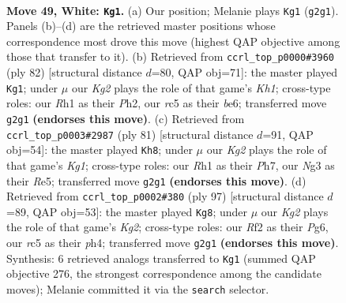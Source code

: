 \documentclass[11pt]{article}
\begin{document}
\clearpage

\begin{figure}[p]\centering
\begin{subfigure}{0.46\textwidth}\centering
\resizebox{\linewidth}{!}{%
\newchessgame
\chessboard[
  setfen={5nk1/1p2Q2p/8/2rq3p/8/6N1/5RK1/7R w - - 10 49},
  showmover=false,
  pgfstyle=straightmove, color=movearrow, markmove={g2-g1}
]}
\caption{}
\end{subfigure}\hfill
\begin{subfigure}{0.46\textwidth}\centering
\resizebox{\linewidth}{!}{%
\newchessgame
\chessboard[
  setfen={8/4p2k/4b2p/2Q5/1n2q1p1/4N3/7P/5R1K w - - 1 42},
  showmover=false,
  pgfstyle=straightmove, color=movearrow, markmove={h1-g1}
]}
\caption{}
\end{subfigure}
\\[4pt]
\begin{subfigure}{0.46\textwidth}\centering
\resizebox{\linewidth}{!}{%
\newchessgame
\chessboard[
  setfen={4r1k1/7p/3P4/4r3/P1Q5/5P2/5KP1/2RbN2q b - - 1 41},
  showmover=false,
  pgfstyle=straightmove, color=movearrow, markmove={g8-h8}
]}
\caption{}
\end{subfigure}\hfill
\begin{subfigure}{0.46\textwidth}\centering
\resizebox{\linewidth}{!}{%
\newchessgame
\chessboard[
  setfen={8/2Q3k1/6pp/PNP5/5r1P/4q1b1/8/6RK b - - 7 49},
  showmover=false,
  pgfstyle=straightmove, color=movearrow, markmove={g7-g8}
]}
\caption{}
\end{subfigure}
\caption{\textbf{Move 49, White: \texttt{Kg1}.} (a) Our position; Melanie plays \texttt{Kg1} (\texttt{g2g1}). Panels (b)--(d) are the retrieved master positions whose correspondence most drove this move (highest QAP objective among those that transfer to it). (b) Retrieved from \texttt{ccrl\_top\_p0000\#3960} (ply 82) [structural distance $d$=80, QAP obj=71]: the master played \texttt{Kg1}; under $\mu$ our \emph{Kg2} plays the role of that game's \emph{Kh1}; cross-type roles: our \emph{R}h1 as their \emph{P}h2, our \emph{r}c5 as their \emph{b}e6; transferred move \texttt{g2g1} \textbf{(endorses this move)}. (c) Retrieved from \texttt{ccrl\_top\_p0003\#2987} (ply 81) [structural distance $d$=91, QAP obj=54]: the master played \texttt{Kh8}; under $\mu$ our \emph{Kg2} plays the role of that game's \emph{Kg1}; cross-type roles: our \emph{R}h1 as their \emph{P}h7, our \emph{N}g3 as their \emph{R}e5; transferred move \texttt{g2g1} \textbf{(endorses this move)}. (d) Retrieved from \texttt{ccrl\_top\_p0002\#380} (ply 97) [structural distance $d$=89, QAP obj=53]: the master played \texttt{Kg8}; under $\mu$ our \emph{Kg2} plays the role of that game's \emph{Kg2}; cross-type roles: our \emph{R}f2 as their \emph{P}g6, our \emph{r}c5 as their \emph{p}h4; transferred move \texttt{g2g1} \textbf{(endorses this move)}. Synthesis: 6 retrieved analogs transferred to \texttt{Kg1} (summed QAP objective 276, the strongest correspondence among the candidate moves); Melanie committed it via the \texttt{search} selector.}
\label{fig:thought-m96}
\end{figure}
\end{document}

